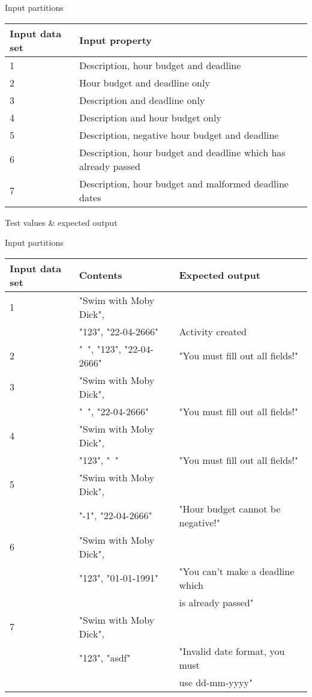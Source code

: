 Input partitions
\begin{center}
  \begin{tabular}{| l | l |}
    \hline
	Input data set & Input property \\ \hline
    1 & Description, hour budget and deadline \\ \hline
    2 & Hour budget and deadline only \\ \hline
    3 & Description and deadline only \\ \hline
    4 & Description and hour budget only \\ \hline
    5 & Description, negative hour budget and deadline  \\ \hline
    6 & Description, hour budget and deadline which has already passed \\ \hline
    7 & Description, hour budget and malformed deadline dates \\ \hline
  \end{tabular}
\end{center}

Test values \& expected output

Input partitions
\begin{center}
  \begin{tabular}{| l | l | l |}
    \hline
	Input data set & Contents & Expected output \\ \hline
    1 & "Swim with Moby Dick", \\ & "123", "22-04-2666" & Activity created \\ \hline
    2 & "\ ", "123", "22-04-2666" & "You must fill out all fields!" \\ \hline
    3 & "Swim with Moby Dick", \\ & "\ ", "22-04-2666" & "You must fill out all fields!" \\ \hline
    4 & "Swim with Moby Dick", \\ & "123", "\ " & "You must fill out all fields!" \\ \hline
    5 & "Swim with Moby Dick", \\ & "-1", "22-04-2666" & "Hour budget cannot be negative!" \\ \hline
    6 & "Swim with Moby Dick", \\ & "123", "01-01-1991" & "You can't make a deadline which \\ && is already passed" \\ \hline
    7 & "Swim with Moby Dick", \\ & "123", "asdf" & "Invalid date format, you must \\ & & use dd-mm-yyyy" \\ \hline
  \end{tabular}
\end{center}
